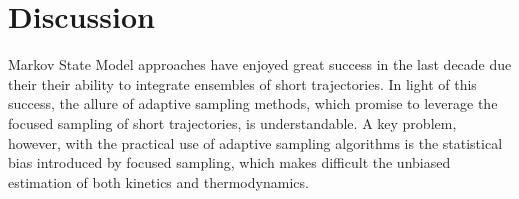 \documentclass[%
 aip,
rsi,%
 amsmath,amssymb,
 reprint,%
]{revtex4-1}
\begin{document}




\section*{Discussion}

Markov State Model approaches have enjoyed great success in the last decade due their their ability to integrate ensembles of short trajectories.  In light of this success, the allure of adaptive sampling methods, which promise to leverage the focused sampling of short trajectories, is understandable. A key problem, however, with the practical use of adaptive sampling algorithms is the statistical bias introduced by focused sampling, which makes difficult the unbiased estimation of both kinetics and thermodynamics.
\end{document}
